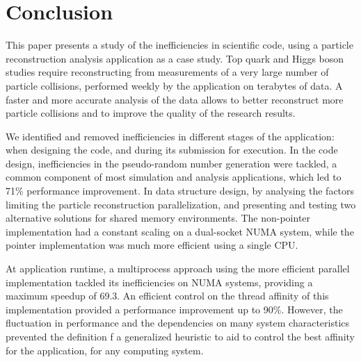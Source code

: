 \section{Conclusion}
\label{conclusion}

This paper presents a study of the inefficiencies in scientific code, using a particle reconstruction analysis application as a case study. Top quark and Higgs boson studies require reconstructing from measurements of a very large number of particle collisions, performed weekly by the \tth application on terabytes of data. A faster and more accurate analysis of the data allows to better reconstruct more particle collisions and to improve the quality of the research results.

We identified and removed inefficiencies in different stages of the application: when designing the code, and during its submission for execution. In the code design, inefficiencies in the pseudo-random number generation were tackled, a common component of most simulation and analysis applications, which led to 71\% performance improvement. In data structure design, by analysing the factors limiting the particle reconstruction parallelization, and presenting and testing two alternative solutions for shared memory environments. The non-pointer implementation had a constant scaling on a dual-socket NUMA system, while the pointer implementation was much more efficient using a single CPU.

At application runtime, a multiprocess approach using the more efficient parallel implementation tackled its inefficiencies on NUMA systems, providing a maximum speedup of 69.3. An efficient control on the thread affinity of this implementation provided a performance improvement up to 90\%. However, the fluctuation in performance and the dependencies on many system characteristics prevented the definition f a generalized heuristic to aid to control the best affinity for the application, for any computing system.

